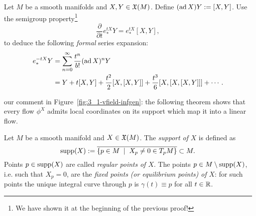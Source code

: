 \begin{exercise}
	Let $M$ be a smooth manifolds and $X,Y\in\mathfrak{X}(M)$.
	Define $(\operatorname{ad} X) Y := [X,Y]$.
	Use the semigroup property\footnote{We have shown it at the beginning of the previous proof!}
	\begin{equation}
		\frac{\partial}{\partial t} e_*^{tX} Y = e_*^{tX}[X,Y],
	\end{equation}
	to deduce the following \emph{formal} series expansion:
	\begin{align}
		e_*^{-tX} Y
		 & = \sum_{n=0}^\infty \frac{t^n}{b!}(\operatorname{ad} X)^n Y                                   \\
		 & = Y + t[X,Y] + \frac{t^2}{2}[X, [X, Y]] + \frac{t^3}{6} [X,[X,[X,Y]]] + \cdots.
	\end{align}
\end{exercise}

 our comment in Figure~\ref{fig:3_1-vfield-infgen}: the following theorem shows that every flow $\phi^X$ admits local coordinates on its support which map it into a linear flow.

\begin{definition}
	Let $M$ be a smooth manifold and $X\in\mathfrak{X}(M)$.
	The \emph{support of $X$} is defined as
	\begin{equation}
		\operatorname{supp}(X):=\overline{\left\lbrace p\in M \;\mid\; X_p\neq 0 \in T_p M\right\rbrace}\subset M.
	\end{equation}
	Points $p\in\operatorname{supp}(X)$ are called \emph{regular points of $X$}.
	The points $p\in M\setminus\operatorname{supp}(X)$, i.e. such that $X_p = 0$, are the \emph{fixed points (or equilibrium points) of $X$}: for such points the unique integral curve through $p$ is $\gamma(t) \equiv p$ for all $t\in\mathbb{R}$.
\end{definition}

